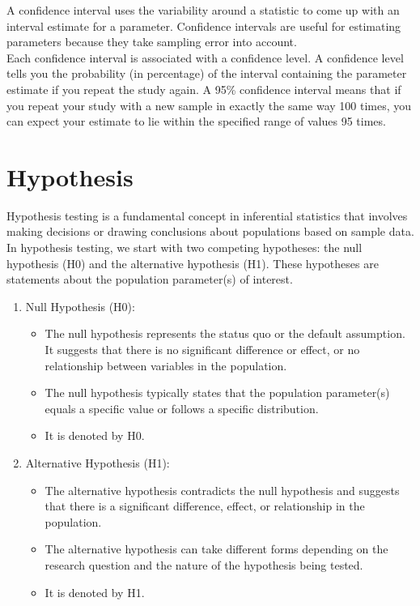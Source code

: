 \documentclass[
]{book}
\providecommand{\tightlist}{%
  \setlength{\itemsep}{0pt}\setlength{\parskip}{0pt}}
\begin{document}
A confidence interval uses the variability around a statistic to come up with an interval estimate for a parameter. Confidence intervals are useful for estimating parameters because they take sampling error into account.\\
Each confidence interval is associated with a confidence level. A confidence level tells you the probability (in percentage) of the interval containing the parameter estimate if you repeat the study again.
A 95\% confidence interval means that if you repeat your study with a new sample in exactly the same way 100 times, you can expect your estimate to lie within the specified range of values 95 times.

\hypertarget{hypothesis}{%
\section{Hypothesis}\label{hypothesis}}

Hypothesis testing is a fundamental concept in inferential statistics that involves making decisions or drawing conclusions about populations based on sample data. In hypothesis testing, we start with two competing hypotheses: the null hypothesis (H0) and the alternative hypothesis (H1). These hypotheses are statements about the population parameter(s) of interest.

\begin{enumerate}
\def\labelenumi{\arabic{enumi}.}
\tightlist
\item
  Null Hypothesis (H0):

  \begin{itemize}
  \tightlist
  \item
    The null hypothesis represents the status quo or the default assumption. It suggests that there is no significant difference or effect, or no relationship between variables in the population.
  \item
    The null hypothesis typically states that the population parameter(s) equals a specific value or follows a specific distribution.
  \item
    It is denoted by H0.
  \end{itemize}
\item
  Alternative Hypothesis (H1):

  \begin{itemize}
  \tightlist
  \item
    The alternative hypothesis contradicts the null hypothesis and suggests that there is a significant difference, effect, or relationship in the population.
  \item
    The alternative hypothesis can take different forms depending on the research question and the nature of the hypothesis being tested.
  \item
    It is denoted by H1.
  \end{itemize}
\end{enumerate}
\end{document}
